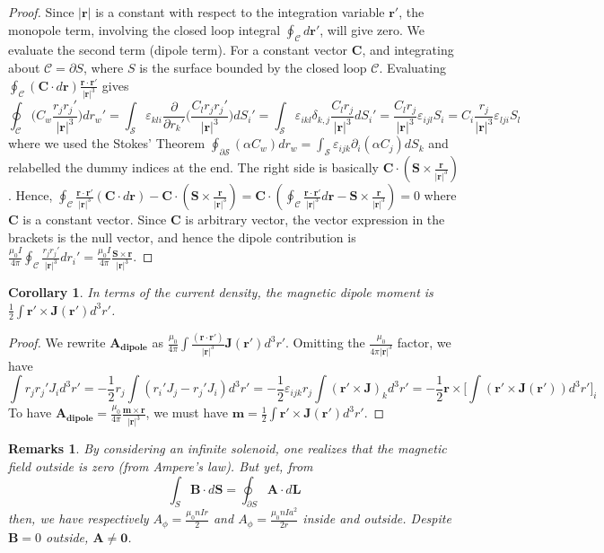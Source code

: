\documentclass[a4paper]{article}
\newtheorem{remarks}{Remarks}[section]
\theoremstyle{new}
\newtheorem{cor}{Corollary}[section]
\begin{document}
\begin{proof}
Since $|\mathbf{r}|$ is a constant with respect to the integration variable $\mathbf{r'}$, the monopole term, involving the closed loop integral $\oint_{\mathcal{C}}d\mathbf{r'}$, will give zero. We evaluate the second term (dipole term). For a constant vector $\mathbf{C}$, and integrating about $\mathcal{C}=\partial S$, where $S$ is the surface bounded by the closed loop $\mathcal{C}$. Evaluating $\oint_{\mathcal{C}}(\mathbf{C}\cdot d\mathbf{r})\frac{\mathbf{r}\cdot\mathbf{r'}}{|\mathbf{r}|^3}$ gives
$$\oint_{\mathcal{C}}\bigg(C_w\frac{r_jr_j'}{|\mathbf{r}|^3}\bigg)dr_w'=\int_{\mathcal{S}}\varepsilon_{kli}\frac{\partial}{\partial r_k'}\bigg(\frac{C_lr_jr_j'}{|\mathbf{r}|^3}\bigg)dS_i'=\int_{\mathcal{S}}\varepsilon_{ikl}\delta_{k,j}\frac{C_lr_j}{|\mathbf{r}|^3}dS_i'=\frac{C_lr_j}{|\mathbf{r}|^3}\varepsilon_{ijl}S_i=C_i\frac{r_j}{|\mathbf{r}|^3}\varepsilon_{lji}S_l$$
where we used the Stokes' Theorem $\oint_{\partial\mathcal{S}}(\alpha C_w)dr_w=\int_{\mathcal{S}}\varepsilon_{ijk}\partial_i(\alpha C_j) dS_k$ and relabelled the dummy indices at the end. The right side is basically $\mathbf{C}\cdot(\mathbf{S}\times\frac{\mathbf{r}}{|\mathbf{r}|^3})$. Hence, $\oint_{\mathcal{C}}\frac{\mathbf{r}\cdot\mathbf{r'}}{|\mathbf{r}|^3}(\mathbf{C}\cdot d\mathbf{r})-\mathbf{C}\cdot(\mathbf{S}\times\frac{\mathbf{r}}{|\mathbf{r}|^3})=\mathbf{C}\cdot(\oint_{\mathcal{C}}\frac{\mathbf{r}\cdot\mathbf{r'}}{|\mathbf{r}|^3}d\mathbf{r}-\mathbf{S}\times\frac{\mathbf{r}}{|\mathbf{r}|^3})=0$ where $\mathbf{C}$ is a constant vector. Since $\mathbf{C}$ is arbitrary vector, the vector expression in the brackets is the null vector, and hence the dipole contribution is $\frac{\mu_0I}{4\pi}\oint_{\mathcal{C}}\frac{r_jr_j'}{|\mathbf{r}|^3}dr_i'=\frac{\mu_0I}{4\pi}\frac{\mathbf{S}\times\mathbf{r}}{|\mathbf{r}|^3}$. 
\end{proof}
\begin{cor}
In terms of the current density, the magnetic dipole moment is $\frac{1}{2}\int\mathbf{r'}\times\mathbf{J}(\mathbf{r'})d^3r'$. 
\end{cor}
\begin{proof}
We rewrite $\mathbf{A_{dipole}}$ as $\frac{\mu_0}{4\pi}\int\frac{(\mathbf{r}\cdot\mathbf{r'})}{|\mathbf{r}|^3}\mathbf{J}(\mathbf{r'})d^3r'$. Omitting the $\frac{\mu_0}{4\pi|\mathbf{r}|^3}$ factor, we have
$$\int r_jr_j'J_id^3r'=-\frac{1}{2}r_j\int(r_i'J_j-r_j'J_i)d^3r'=-\frac{1}{2}\varepsilon_{ijk}r_j\int(\mathbf{r'}\times\mathbf{J})_kd^3r'=-\frac{1}{2}\mathbf{r}\times\bigg[\int(\mathbf{r'}\times\mathbf{J}(\mathbf{r'}))d^3r'\bigg]_i$$
To have $\mathbf{A_{dipole}}=\frac{\mu_0}{4\pi}\frac{\mathbf{m}\times\mathbf{r}}{|\mathbf{r}|^3}$, we must have $\mathbf{m}=\frac{1}{2}\int\mathbf{r'}\times\mathbf{J}(\mathbf{r'})d^3r'$.
\end{proof}
\begin{remarks}
By considering an infinite solenoid, one realizes that the magnetic field outside is zero (from Ampere's law). But yet, from
$$\int_S\mathbf{B}\cdot d\mathbf{S}=\oint_{\partial S}\mathbf{A}\cdot d\mathbf{L}$$
then, we have respectively $A_\phi=\frac{\mu_0nIr}{2}$ and $A_\phi=\frac{\mu_0nIa^2}{2r}$ inside and outside. Despite $\mathbf{B}=0$ outside, $\mathbf{A}\neq\boldsymbol{0}$.
\end{remarks}
\newpage
\end{document}
